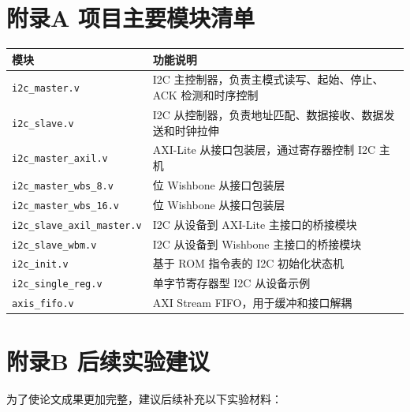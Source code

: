 \section{附录A 项目主要模块清单}\label{ux9644ux5f55a-ux9879ux76eeux4e3bux8981ux6a21ux5757ux6e05ux5355}

{\def\LTcaptype{none} %
\begin{longtable}[]{@{}
  >{\raggedright\arraybackslash}p{}
  >{\raggedright\arraybackslash}p{}@{}}
\toprule\noalign{}
\begin{minipage}[b]{\linewidth}\raggedright
模块
\end{minipage} & \begin{minipage}[b]{\linewidth}\raggedright
功能说明
\end{minipage} \\
\midrule\noalign{}
\endhead
\bottomrule\noalign{}
\endlastfoot
\texttt{i2c\_master.v} & I2C 主控制器，负责主模式读写、起始、停止、ACK 检测和时序控制 \\
\texttt{i2c\_slave.v} & I2C 从控制器，负责地址匹配、数据接收、数据发送和时钟拉伸 \\
\texttt{i2c\_master\_axil.v} & AXI-Lite 从接口包装层，通过寄存器控制 I2C 主机 \\
\texttt{i2c\_master\_wbs\_8.v} & 8 位 Wishbone 从接口包装层 \\
\texttt{i2c\_master\_wbs\_16.v} & 16 位 Wishbone 从接口包装层 \\
\texttt{i2c\_slave\_axil\_master.v} & I2C 从设备到 AXI-Lite 主接口的桥接模块 \\
\texttt{i2c\_slave\_wbm.v} & I2C 从设备到 Wishbone 主接口的桥接模块 \\
\texttt{i2c\_init.v} & 基于 ROM 指令表的 I2C 初始化状态机 \\
\texttt{i2c\_single\_reg.v} & 单字节寄存器型 I2C 从设备示例 \\
\texttt{axis\_fifo.v} & AXI Stream FIFO，用于缓冲和接口解耦 \\
\end{longtable}
}

\section{附录B 后续实验建议}\label{ux9644ux5f55b-ux540eux7eedux5b9eux9a8cux5efaux8bae}

为了使论文成果更加完整，建议后续补充以下实验材料：

